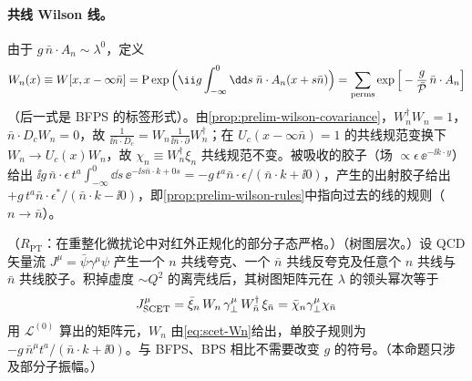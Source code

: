 \paragraph{共线 Wilson 线。}
由于 $g\,\bar n\cdot A_n\sim\lambda^0$，定义
\begin{equation}\label{eq:scet-Wn}
W_n(x)\equiv W[x,x-\infty\bar n]=\mathrm P\exp\Big(\ii g\int_{-\infty}^0\dd s\;\bar n\cdot A_n(x+s\bar n)\Big)
=\sum_{\rm perms}\exp\Big[-\frac{g}{\bar{\mathcal P}}\,\bar n\cdot A_n\Big]
\end{equation}
（后一式是 BFPS 的标签形式\cite{BauerEtAl2001}）。由\cref{prop:prelim-wilson-covariance}，$W_n^\dagger W_n=1$，$\bar n\cdot D_cW_n=0$，故 $\frac{1}{\ii\bar n\cdot D_c}=W_n\frac{1}{\ii\bar n\cdot\partial}W_n^\dagger$；在 $U_c(x-\infty\bar n)=1$ 的共线规范变换下 $W_n\to U_c(x)W_n$，故 $\chi_n\equiv W_n^\dagger\xi_n$ 共线规范不变。被吸收的胶子（场 $\propto\epsilon\,\ee^{-\ii k\cdot y}$）给出 $\ii g\,\bar n\cdot\epsilon\,t^a\int_{-\infty}^0\dd s\,\ee^{-\ii s\bar n\cdot k+0s}=-g\,t^a\bar n\cdot\epsilon/(\bar n\cdot k+\ii0)$，产生的出射胶子给出 $+g\,t^a\bar n\cdot\epsilon^*/(\bar n\cdot k-\ii0)$，即\cref{prop:prelim-wilson-rules}中指向过去的线的规则（$n\to\bar n$）。

\begin{proposition}\label{prop:scet-wilson}
（$R_{\mathrm{PT}}$：在重整化微扰论中对红外正规化的部分子态严格。）（树图层次。）设 QCD 矢量流 $J^\mu=\bar\psi\gamma^\mu\psi$ 产生一个 $n$ 共线夸克、一个 $\bar n$ 共线反夸克及任意个 $n$ 共线与 $\bar n$ 共线胶子。积掉虚度 $\sim Q^2$ 的离壳线后，其树图矩阵元在 $\lambda$ 的领头幂次等于
\begin{equation}\label{eq:scet-Jtree}
J^\mu_{\rm SCET}=\bar\xi_n\,W_n\,\gamma_\perp^\mu\,W_{\bar n}^\dagger\,\xi_{\bar n}=\bar\chi_n\gamma_\perp^\mu\chi_{\bar n}
\end{equation}
用 $\mathcal L^{(0)}$ 算出的矩阵元，$W_n$ 由\cref{eq:scet-Wn}给出，单胶子规则为 $-g\,\bar n^\mu t^a/(\bar n\cdot k+\ii0)$。与 BFPS、BPS 相比不需要改变 $g$ 的符号。（本命题只涉及部分子振幅。）
\end{proposition}

